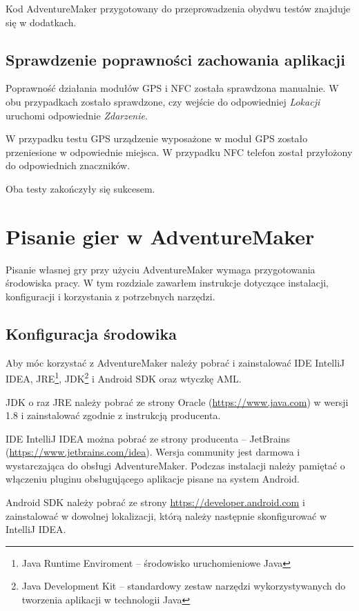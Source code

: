 \documentclass[openright]{xmgr}
\begin{document}
Kod AdventureMaker przygotowany do przeprowadzenia obydwu testów znajduje się w dodatkach.

\section{Sprawdzenie poprawności zachowania aplikacji}

Poprawność działania modułów GPS i NFC została sprawdzona manualnie. W obu przypadkach zostało sprawdzone, czy wejście do odpowiedniej \textit{Lokacji} uruchomi odpowiednie \textit{Zdarzenie}.

W przypadku testu GPS urządzenie wyposażone w moduł GPS zostało przeniesione w odpowiednie miejsca. W przypadku NFC telefon został przyłożony do odpowiednich znaczników. 

Oba testy zakończyły się sukcesem.  

\chapter{Pisanie gier w AdventureMaker}
Pisanie własnej gry przy użyciu AdventureMaker wymaga przygotowania środowiska pracy. W tym rozdziale zawarłem instrukcje dotyczące instalacji, konfiguracji i korzystania z potrzebnych narzędzi. 

\section{Konfiguracja środowika}

Aby móc korzystać z AdventureMaker należy pobrać i zainstalować IDE IntelliJ IDEA, JRE\footnote{Java Runtime Enviroment -- środowisko uruchomieniowe Java}, JDK\footnote{Java Development Kit -- standardowy zestaw narzędzi wykorzystywanych do tworzenia aplikacji w technologii Java} i Android SDK oraz wtyczkę AML.

JDK o raz JRE należy pobrać ze strony Oracle (\url{https://www.java.com}) w wersji 1.8 i zainstalować zgodnie z instrukcją producenta.

IDE IntelliJ IDEA można pobrać ze strony producenta -- JetBrains (\url{https://www.jetbrains.com/idea}). Wersja community jest darmowa i wystarczająca do obsługi AdventureMaker. Podczas instalacji należy pamiętać o włączeniu pluginu obsługującego aplikacje pisane na system Android.

Android SDK  należy pobrać ze strony \url{https://developer.android.com} i zainstalować w dowolnej lokalizacji, którą należy następnie skonfigurować w IntelliJ IDEA.
\end{document}
